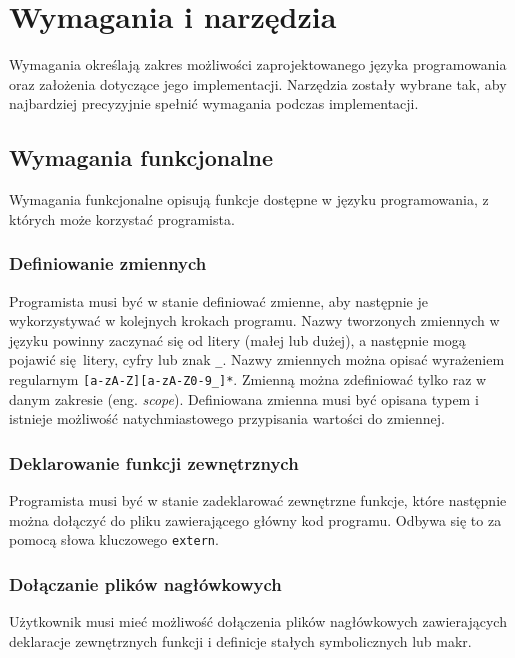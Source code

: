 \chapter{Wymagania i narzędzia}
\label{ch:wymagania-i-narzedzia}

Wymagania określają zakres możliwości zaprojektowanego języka programowania oraz założenia dotyczące jego implementacji. Narzędzia zostały wybrane tak, aby najbardziej precyzyjnie spełnić wymagania podczas implementacji.

\section{Wymagania funkcjonalne}

Wymagania funkcjonalne opisują funkcje dostępne w języku programowania, z których może korzystać programista.

\subsection{Definiowanie zmiennych}

Programista musi być w stanie definiować zmienne, aby następnie je wykorzystywać w kolejnych krokach programu. Nazwy tworzonych zmiennych w języku powinny zaczynać się od litery (małej lub dużej), a następnie mogą pojawić się litery, cyfry lub znak \verb|_|. Nazwy zmiennych można opisać wyrażeniem regularnym \verb|[a-zA-Z][a-zA-Z0-9_]*|. Zmienną można zdefiniować tylko raz w danym zakresie (eng. \textit{scope}). Definiowana zmienna musi być opisana typem i istnieje możliwość natychmiastowego przypisania wartości do zmiennej.

\subsection{Deklarowanie funkcji zewnętrznych}

Programista musi być w stanie zadeklarować zewnętrzne funkcje, które następnie można dołączyć do pliku zawierającego główny kod programu. Odbywa się to za pomocą słowa kluczowego \verb|extern|.

\subsection{Dołączanie plików nagłówkowych}

Użytkownik musi mieć możliwość dołączenia plików nagłówkowych zawierających deklaracje zewnętrznych funkcji i definicje stałych symbolicznych lub makr.


